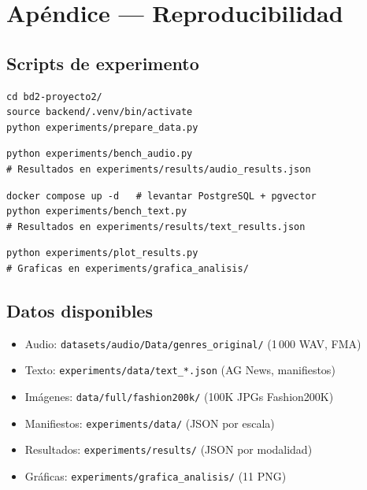 \documentclass[12pt,a4paper]{article}
\begin{document}
\section*{Apéndice — Reproducibilidad}

\subsection*{Scripts de experimento}

\begin{lstlisting}[caption={Preparar datos}]
cd bd2-proyecto2/
source backend/.venv/bin/activate
python experiments/prepare_data.py
\end{lstlisting}

\begin{lstlisting}[caption={Ejecutar benchmark de audio}]
python experiments/bench_audio.py
# Resultados en experiments/results/audio_results.json
\end{lstlisting}

\begin{lstlisting}[caption={Ejecutar benchmark de texto (requiere Docker)}]
docker compose up -d   # levantar PostgreSQL + pgvector
python experiments/bench_text.py
# Resultados en experiments/results/text_results.json
\end{lstlisting}

\begin{lstlisting}[caption={Generar gráficas comparativas}]
python experiments/plot_results.py
# Graficas en experiments/grafica_analisis/
\end{lstlisting}

\subsection*{Datos disponibles}

\begin{itemize}
  \item Audio: \texttt{datasets/audio/Data/genres\_original/} (1\,000 WAV, FMA)
  \item Texto: \texttt{experiments/data/text\_*.json} (AG News, manifiestos)
  \item Imágenes: \texttt{data/full/fashion200k/} (100K JPGs Fashion200K)
  \item Manifiestos: \texttt{experiments/data/} (JSON por escala)
  \item Resultados: \texttt{experiments/results/} (JSON por modalidad)
  \item Gráficas: \texttt{experiments/grafica\_analisis/} (11 PNG)
\end{itemize}

\vfill
\end{document}

